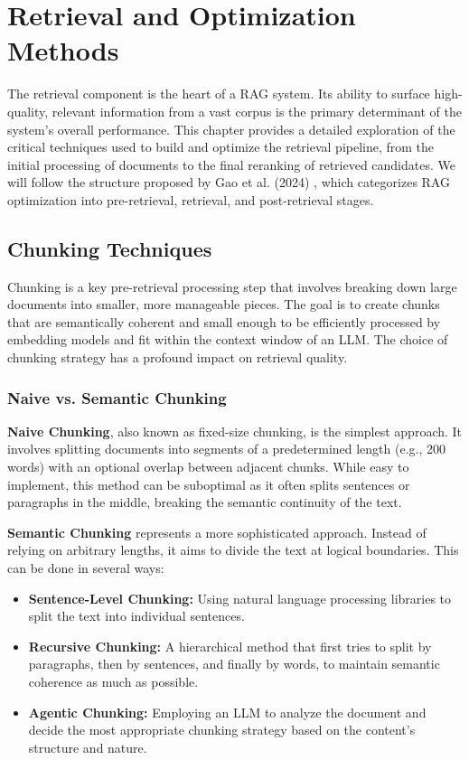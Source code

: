 \chapter{Retrieval and Optimization Methods}
\label{chap:retrieval_optimization}

The retrieval component is the heart of a RAG system. Its ability to surface high-quality, relevant information from a vast corpus is the primary determinant of the system's overall performance. This chapter provides a detailed exploration of the critical techniques used to build and optimize the retrieval pipeline, from the initial processing of documents to the final reranking of retrieved candidates. We will follow the structure proposed by Gao et al. (2024) \autocite{gao2024retrievalaugmented}, which categorizes RAG optimization into pre-retrieval, retrieval, and post-retrieval stages.

\section{Chunking Techniques}
Chunking is a key pre-retrieval processing step that involves breaking down large documents into smaller, more manageable pieces. The goal is to create chunks that are semantically coherent and small enough to be efficiently processed by embedding models and fit within the context window of an LLM. The choice of chunking strategy has a profound impact on retrieval quality.

\subsection{Naive vs. Semantic Chunking}
\textbf{Naive Chunking}, also known as fixed-size chunking, is the simplest approach. It involves splitting documents into segments of a predetermined length (e.g., 200 words) with an optional overlap between adjacent chunks. While easy to implement, this method can be suboptimal as it often splits sentences or paragraphs in the middle, breaking the semantic continuity of the text.

\textbf{Semantic Chunking} represents a more sophisticated approach. Instead of relying on arbitrary lengths, it aims to divide the text at logical boundaries. This can be done in several ways:
\begin{itemize}
    \item \textbf{Sentence-Level Chunking:} Using natural language processing libraries to split the text into individual sentences.
    \item \textbf{Recursive Chunking:} A hierarchical method that first tries to split by paragraphs, then by sentences, and finally by words, to maintain semantic coherence as much as possible.
    \item \textbf{Agentic Chunking:} Employing an LLM to analyze the document and decide the most appropriate chunking strategy based on the content's structure and nature.
\end{itemize}

